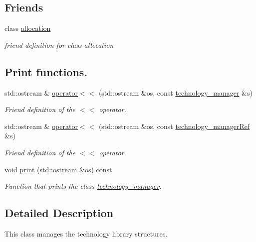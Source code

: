 \subsection*{Friends}
\begin{DoxyCompactItemize}
\item 
class \hyperlink{classtechnology__manager_a2dc219c556df071c0061c3e9ddfa1dca}{allocation}
\begin{DoxyCompactList}\small\item\em friend definition for class allocation \end{DoxyCompactList}\end{DoxyCompactItemize}
\subsection*{Print functions.}
\begin{DoxyCompactItemize}
\item 
std\+::ostream \& \hyperlink{classtechnology__manager_a7f3288b8143532843313a11ac7d53eda}{operator$<$$<$} (std\+::ostream \&os, const \hyperlink{classtechnology__manager}{technology\+\_\+manager} \&s)
\begin{DoxyCompactList}\small\item\em Friend definition of the $<$$<$ operator. \end{DoxyCompactList}\item 
std\+::ostream \& \hyperlink{classtechnology__manager_a15b9b3e0d9c8aeef181027d6cbfee9ef}{operator$<$$<$} (std\+::ostream \&os, const \hyperlink{technology__manager_8hpp_a4b9ecd440c804109c962654f9227244e}{technology\+\_\+manager\+Ref} \&s)
\begin{DoxyCompactList}\small\item\em Friend definition of the $<$$<$ operator. \end{DoxyCompactList}\item 
void \hyperlink{classtechnology__manager_a945cc92ea4b049fa9e973981a7a1dc9f}{print} (std\+::ostream \&os) const
\begin{DoxyCompactList}\small\item\em Function that prints the class \hyperlink{classtechnology__manager}{technology\+\_\+manager}. \end{DoxyCompactList}\end{DoxyCompactItemize}


\subsection{Detailed Description}
This class manages the technology library structures. 

